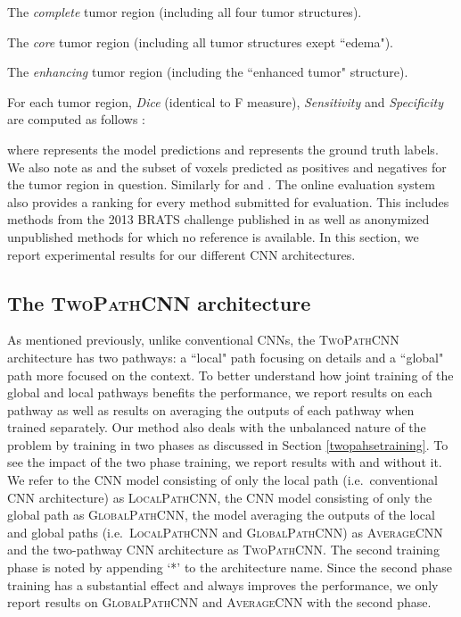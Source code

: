 \documentclass[final,5p,times,twocolumn]{elsarticle}
\begin{document}
\begin{enumerate}[a)]

{\setlength\itemindent{25pt} \item The {\it complete} tumor region (including all four tumor structures).}

{\setlength\itemindent{25pt}\item The {\it core} tumor region (including all tumor structures exept ``edema").}

{\setlength\itemindent{25pt}\item The {\it enhancing} tumor region (including the ``enhanced tumor" structure).}

\end{enumerate} 

For each tumor region, {\it Dice} (identical to F measure), {\it Sensitivity} and {\it Specificity} are computed as follows :







where  represents the model predictions and  represents the ground truth labels. We also note as  and  the subset of voxels predicted as positives and negatives for the tumor region in question. Similarly for  and .  The online evaluation system also provides a ranking for every method submitted for evaluation. This includes methods from the 2013 BRATS challenge published in \citep{Menze2014} as well as anonymized unpublished methods for which no reference is available. In this section, we report experimental results for our different CNN architectures. 



\subsection{The \textsc{TwoPathCNN} architecture}



As mentioned previously, unlike conventional CNNs, the \textsc{TwoPathCNN} architecture has two pathways: a ``local" path focusing on details and a ``global" path more focused on the context. To better understand how joint training of the global and local pathways benefits the performance, we report results on each pathway as well as results on averaging the outputs of each pathway when trained separately. Our method also deals with the unbalanced nature of the problem by training in two phases as discussed in Section \ref{twopahsetraining}. To see the impact of the two phase training, we report results with and without it. We refer to the CNN model consisting of only the local path (i.e.\ conventional CNN architecture) as \textsc{LocalPathCNN}, the CNN model consisting of only the global path as \textsc{GlobalPathCNN}, the model averaging the outputs of the local and global paths (i.e.\ \textsc{LocalPathCNN} and \textsc{GlobalPathCNN}) as \textsc{AverageCNN} and the two-pathway CNN architecture as \textsc{TwoPathCNN}. The second training phase is noted by appending `*' to the architecture name. Since the second phase training has a substantial effect and always improves the performance, we only report results on  \textsc{GlobalPathCNN} and \textsc{AverageCNN} with the second phase.  
\end{document}

